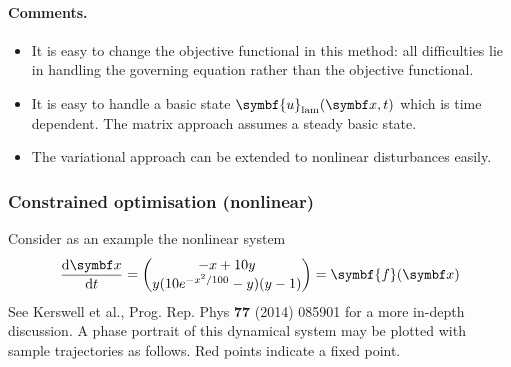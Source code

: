 \documentclass{jknotes}
\renewcommand{\u}{\symbf{u}}
\begin{document}
\paragraph{Comments.}
\begin{itemize}
	\item It is easy to change the objective functional in this method: all
		difficulties lie in handling the governing equation rather than the
		objective functional.
	\item It is easy to handle a basic state $\u_{\text{lam}}(\x,t)$ which is
		time dependent. The matrix approach assumes a steady basic state.
	\item The variational approach can be extended to nonlinear disturbances
		easily.
\end{itemize}

\subsubsection{Constrained optimisation (nonlinear)}
Consider as an example the nonlinear system
\begin{equation}
	\frac{\diffd \x}{\diffd t} = \begin{pmatrix} -x + 10y \\
	y(10e^{-x^2/100}-y)(y-1) \end{pmatrix} = \symbf{f}(\x)
	\label{eq:l14:1}
\end{equation}
See Kerswell et al., Prog. Rep. Phys \textbf{77} (2014) 085901 for a more
in-depth discussion. A phase portrait of this dynamical system may be plotted
with sample trajectories as follows. Red points indicate a fixed point.
\end{document}
